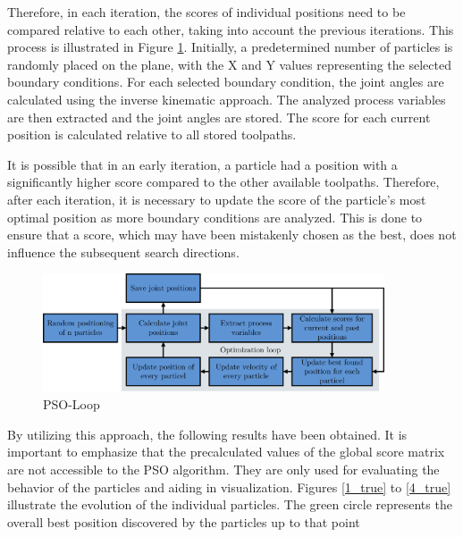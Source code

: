 Therefore, in each iteration, the scores of individual positions need to be compared relative to each other, taking into account the previous iterations. This process is illustrated in Figure \ref{swarmloop}. Initially, a predetermined number of particles is randomly placed on the plane, with the X and Y values representing the selected boundary conditions. For each selected boundary condition, the joint angles are calculated using the inverse kinematic approach. The analyzed process variables are then extracted and the joint angles are stored. The score for each current position is calculated relative to all stored toolpaths.

It is possible that in an early iteration, a particle had a position with a significantly higher score compared to the other available toolpaths. Therefore, after each iteration, it is necessary to update the score of the particle's most optimal position as more boundary conditions are analyzed. This is done to ensure that a score, which may have been mistakenly chosen as the best, does not influence the subsequent search directions.

\begin{figure}[H]
	\centerline{\includegraphics[width=0.9\textwidth]{figures/swarmloop.png}}
	\caption{PSO-Loop}
	\label{swarmloop}
\end{figure}

By utilizing this approach, the following results have been obtained. It is important to emphasize that the precalculated values of the global score matrix are not accessible to the \acrshort{PSO} algorithm. They are only used for evaluating the behavior of the particles and aiding in visualization. Figures \ref{1_true} to \ref{4_true} illustrate the evolution of the individual particles. The green circle represents the overall best position discovered by the particles up to that point
\newpage

